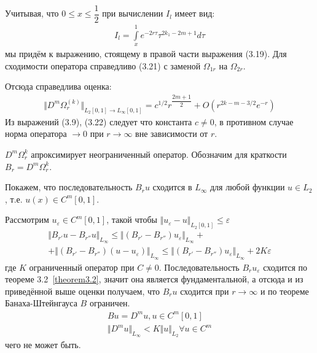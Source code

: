 Учитывая, что $ 0 \leq x \leq \dfrac{1}{2} $ при вычислении $ I_l $ имеет вид:
\begin{equation}
\begin{array}{c}
\nonumber

I_l = \int\limits_x^1 e^{-2r\tau}\tau^{2k_1 - 2m + 1}d\tau

\end{array}
\end{equation}
мы придём к выражению, стоящему в правой части выражения (3.19). Для сходимости оператора справедливо (3.21) с заменой $ \Omega_{1r} $ на $ \Omega_{2r} $. 

Отсюда справедлива оценка:
\begin{equation}
\begin{array}{c}

\Vert D^m \Omega_r^{(k)} \Vert_{L_2[0,1] \rightarrow L_\infty[0,1]} = c^{1/2}r^{\dfrac{2m+1}{2}} + O(r^{2k-m-3/2}e^{-r})

\end{array}
\end{equation}
Из выражений (3.9), (3.22) следует что константа $ c \neq 0 $, в противном случае норма оператора $ \rightarrow 0 $ при $ r \rightarrow \infty $ вне зависимости от $ r $.

$ D^m\Omega_r^{k} $ апроксимирует неограниченный оператор. Обозначим для краткости $ B_r = D^m\Omega_r^{k} $.

Покажем, что последовательность $B_ru$ сходится в $ L_\infty $ для любой функции $ u \in L_2 $, т.е. $ u(x) \in C^m[0,1] $.

Рассмотрим $ u_\varepsilon \in C^m[0,1] $, такой чтобы $ \Vert u_\varepsilon - u \Vert_{L_2[0,1]} \leq \varepsilon $
\begin{equation}
\begin{array}{c}
\nonumber

\Vert B_{r'}u - B_{r''}u \Vert_{L_\infty} \leq \Vert (B_{r'} - B_{r''})u_\varepsilon \Vert_{L_\infty} + \\ + \Vert (B_{r'} - B_{r''})(u-u_\varepsilon) \Vert_{L_\infty} \leq \Vert (B_{r'} - B_{r''})u_\varepsilon \Vert_{L_\infty} + 2K\varepsilon

\end{array}
\end{equation}
где $ K $ ограниченный оператор при $ C \neq 0 $. Последовательность $ B_ru_\varepsilon $ сходится по теореме 3.2~\eqref{theorem3.2}, значит она является фундаментальной, а отсюда и из приведённой выше оценки получаем, что $ B_ru $ сходится при $ r \rightarrow \infty $ и по теореме Банаха-Штейнгауса $ B $ ограничен.
\begin{equation}
\begin{array}{c}
\nonumber

Bu = D^mu, u \in C^m[0,1] \\
\Vert D^mu \Vert_{L_\infty} < K\Vert u \Vert_{L_2} \forall u \in C^m

\end{array}
\end{equation}
чего не может быть.

